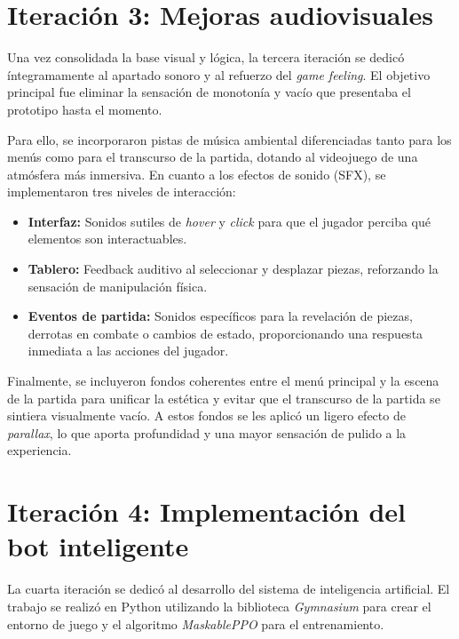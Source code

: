 \section{Iteración 3: Mejoras audiovisuales}

Una vez consolidada la base visual y lógica, la tercera iteración se dedicó íntegramamente al apartado sonoro y al refuerzo del \textit{game feeling}. El objetivo principal fue eliminar la sensación de monotonía y vacío que presentaba el prototipo hasta el momento.

Para ello, se incorporaron pistas de música ambiental diferenciadas tanto para los menús como para el transcurso de la partida, dotando al videojuego de una atmósfera más inmersiva. En cuanto a los efectos de sonido (SFX), se implementaron tres niveles de interacción:

\begin{itemize}
	\item \textbf{Interfaz:} Sonidos sutiles de \textit{hover} y \textit{click} para que el jugador perciba qué elementos son interactuables.
	\item \textbf{Tablero:} Feedback auditivo al seleccionar y desplazar piezas, reforzando la sensación de manipulación física.
	\item \textbf{Eventos de partida:} Sonidos específicos para la revelación de piezas, derrotas en combate o cambios de estado, proporcionando una respuesta inmediata a las acciones del jugador.
\end{itemize}

Finalmente, se incluyeron fondos coherentes entre el menú principal y la escena de la partida para unificar la estética y evitar que el transcurso de la partida se sintiera visualmente vacío. A estos fondos se les aplicó un ligero efecto de \textit{parallax}, lo que aporta profundidad y una mayor sensación de pulido a la experiencia.

\section{Iteración 4: Implementación del bot inteligente}

La cuarta iteración se dedicó al desarrollo del sistema de inteligencia artificial. El trabajo se realizó en Python utilizando la biblioteca \textit{Gymnasium} para crear el entorno de juego y el algoritmo \textit{MaskablePPO} para el entrenamiento.

